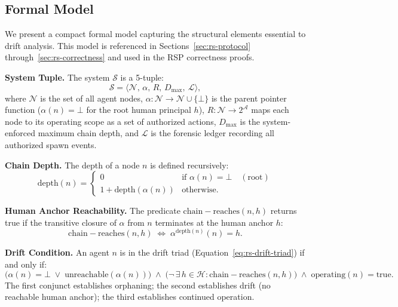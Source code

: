 \subsection{Formal Model}
\label{sec:rs-drift-model}

We present a compact formal model capturing the structural elements essential to drift analysis. This model is referenced in Sections~\ref{sec:rs-protocol} through~\ref{sec:rs-correctness} and used in the RSP correctness proofs.

\medskip
\noindent\textbf{System Tuple.}
The system $\mathcal{S}$ is a 5-tuple:
\begin{equation}
\mathcal{S} = \langle \mathcal{N},\, \alpha,\, R,\, D_{\max},\ \mathcal{L} \rangle,
\label{eq:rs-system-model}
\end{equation}
where $\mathcal{N}$ is the set of all agent nodes, $\alpha: \mathcal{N} \rightarrow \mathcal{N} \cup \{\bot\}$ is the parent pointer function ($\alpha(n) = \bot$ for the root human principal $h$), $R: \mathcal{N} \rightarrow 2^{\mathcal{A}}$ maps each node to its operating scope as a set of authorized actions, $D_{\max}$ is the system-enforced maximum chain depth, and $\mathcal{L}$ is the forensic ledger recording all authorized spawn events.

\medskip
\noindent\textbf{Chain Depth.}
The depth of a node $n$ is defined recursively:
\begin{equation}
\mathrm{depth}(n) =
\begin{cases}
0             & \text{if } \alpha(n) = \bot \quad (\text{root}) \\[4pt]
1 + \mathrm{depth}(\alpha(n)) & \text{otherwise}.
\end{cases}
\label{eq:rs-depth}
\end{equation}

\medskip
\noindent\textbf{Human Anchor Reachability.}
The predicate $\mathrm{chain-reaches}(n, h)$ returns true if the transitive closure of $\alpha$ from $n$ terminates at the human anchor $h$:
\begin{equation}
\mathrm{chain-reaches}(n, h) \;\iff\; \alpha^{\mathrm{depth}(n)}(n) = h.
\label{eq:rs-chain-reaches}
\end{equation}

\medskip
\noindent\textbf{Drift Condition.}
An agent $n$ is in the drift triad (Equation~\ref{eq:rs-drift-triad}) if and only if:
\begin{equation}
\bigl( \alpha(n) = \bot \;\lor\; \mathrm{unreachable}(\alpha(n)) \bigr)
\;\land\;
\bigl( \neg\,\exists\, h \in \mathcal{H} : \mathrm{chain-reaches}(n, h) \bigr)
\;\land\;
\mathrm{operating}(n) = \mathrm{true}.
\label{eq:rs-drift-condition}
\end{equation}
The first conjunct establishes orphaning; the second establishes drift (no reachable human anchor); the third establishes continued operation.

